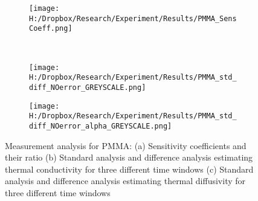 \documentclass[12pt]{report}
\begin{document}
\begin{comment}

\begin{table}


\begin{tabular}{|l|c|c|c|}

\hline
& PMMA & XPS & Straw  \tabularnewline

\hline

\(\approx t_0\) {[}\(s\){]} & \(100\) & \(50\) & \(80\)\tabularnewline

\hline

\(\approx t_{max}\){[}\(s\){]} & \(390\) & \(395\) &
\(335\)\tabularnewline

\hline

\end{tabular}
\caption[Table caption text]{Time window chosen for parameter estimation for the three different samples} 

\end{table}
\end{comment}



\begin{figure}
\begin{subfigure}{1\textwidth}
\centering
\texttt{[image: H:/Dropbox/Research/Experiment/Results/PMMA\_SensCoeff.png]}
\caption{}
\end{subfigure}\\
\begin{subfigure}{.5\textwidth}
\centering
\texttt{[image: H:/Dropbox/Research/Experiment/Results/PMMA\_std\_diff\_NOerror\_GREYSCALE.png]}
\caption{}
\end{subfigure}\hfill
\begin{subfigure}{.5\textwidth}
\centering
\texttt{[image: H:/Dropbox/Research/Experiment/Results/PMMA\_std\_diff\_NOerror\_alpha\_GREYSCALE.png]}
\caption{}
\end{subfigure}
\caption{Measurement analysis for PMMA: (a) Sensitivity coefficients and their ratio (b) Standard analysis and difference analysis estimating thermal conductivity for three different time windows (c) Standard analysis and difference analysis estimating thermal diffusivity for three different time windows}

\end{figure}
\end{document}
